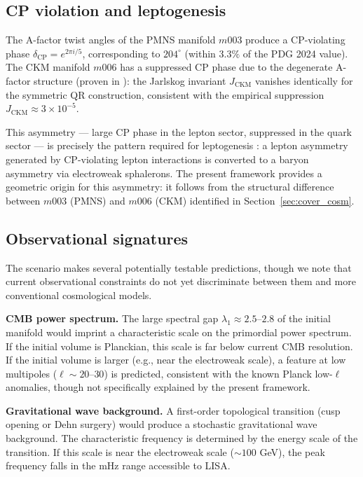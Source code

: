 ﻿\documentclass[12pt]{article}
\theoremstyle{definition}
\begin{document}
\subsection{CP violation and leptogenesis}

The A-factor twist angles of the PMNS manifold $m003$ produce a
CP-violating phase $\delta_\mathrm{CP} = e^{2\pi i/5}$, corresponding
to $204^\circ$ (within $3.3\%$ of the PDG 2024 value). The CKM
manifold $m006$ has a suppressed CP phase due to the degenerate
A-factor structure (proven in \cite{Gentry:CP}): the Jarlskog
invariant $J_\mathrm{CKM}$ vanishes identically for the symmetric QR
construction, consistent with the empirical suppression
$J_\mathrm{CKM} \approx 3 \times 10^{-5}$.

This asymmetry --- large CP phase in the lepton sector, suppressed in
the quark sector --- is precisely the pattern required for
leptogenesis \cite{leptogenesis}: a lepton asymmetry generated by
CP-violating lepton interactions is converted to a baryon asymmetry
via electroweak sphalerons. The present framework provides a
geometric origin for this asymmetry: it follows from the structural
difference between $m003$ (PMNS) and $m006$ (CKM) identified in
Section~\ref{sec:cover_cosm}.

\subsection{Observational signatures}

The scenario makes several potentially testable predictions,
though we note that current observational constraints do not yet
discriminate between them and more conventional cosmological models.

\textbf{CMB power spectrum.} The large spectral gap
$\lambda_1 \approx 2.5$--$2.8$ of the initial manifold would
imprint a characteristic scale on the primordial power spectrum.
If the initial volume is Planckian, this scale is far below current
CMB resolution. If the initial volume is larger (e.g., near the
electroweak scale), a feature at low multipoles ($\ell \sim 20$--$30$)
is predicted, consistent with the known Planck low-$\ell$ anomalies,
though not specifically explained by the present framework.

\textbf{Gravitational wave background.} A first-order topological
transition (cusp opening or Dehn surgery) would produce a stochastic
gravitational wave background. The characteristic frequency is
determined by the energy scale of the transition. If this scale is
near the electroweak scale ($\sim 100$ GeV), the peak frequency
falls in the mHz range accessible to LISA.
\end{document}
